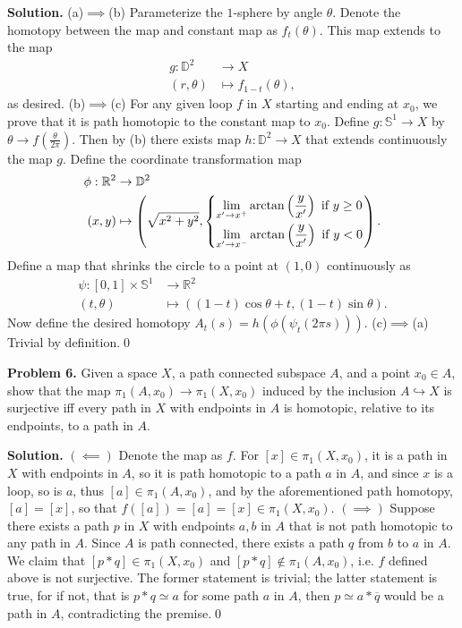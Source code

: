 \documentclass[10pt]{article}
\begin{document}
\begin{CJK*}{UTF8}{gbsn}
\textbf{Solution.} (a)$\implies$(b) Parameterize the $1$-sphere by angle $\theta$. Denote the homotopy between the map and constant map as $f_t(\theta)$. This map extends to the map \begin{align*}g:\mathbb{D}^2&\to X\\(r,\theta)&\mapsto f_{1-t}(\theta),\end{align*} as desired. (b)$\implies$(c) For any given loop $f$ in $X$ starting and ending at $x_0$, we prove that it is path homotopic to the constant map to $x_0$. Define $g:\mathbb{S}^1\to X$ by $\theta\to f(\frac{\theta}{2\pi})$. Then by (b) there exists map $h:\mathbb{D}^2\to X$ that extends continuously the map $g$. Define the coordinate transformation map \begin{align*}\phi:\mathbb{R}^2&\to\mathbb{D}^2\\(x,y)&\mapsto\left(\sqrt{x^2+y^2},\begin{dcases}\lim_{x'\to x^+}\arctan\left(\frac{y}{x'}\right)\text{ if }y\geq0\\\lim_{x'\to x^-}\arctan\left(\frac{y}{x'}\right)\text{ if }y<0\end{dcases}\right).\end{align*} Define a map that shrinks the circle to a point at $(1,0)$ continuously as \begin{align*}\psi:[0,1]\times\mathbb{S}^1&\to\mathbb{R}^2\\(t,\theta)&\mapsto((1-t)\cos\theta+t,(1-t)\sin\theta).\end{align*} Now define the desired homotopy $A_t(s)=h(\phi(\psi_t(2\pi s)))$. (c)$\implies$(a) Trivial by definition.\qed

\textbf{Problem 6.} Given a space $X$, a path connected subspace $A$, and a point $x_0\in A$, show that the map $\pi_1(A,x_0)\to\pi_1(X,x_0)$ induced by the inclusion $A\hookrightarrow X$ is surjective iff every path in $X$ with endpoints in $A$ is homotopic, relative to its endpoints, to a path in $A$.

\textbf{Solution.} $(\impliedby)$ Denote the map as $f$. For $[x]\in\pi_1(X,x_0)$, it is a path in $X$ with endpoints in $A$, so it is path homotopic to a path $a$ in $A$, and since $x$ is a loop, so is $a$, thus $[a]\in\pi_1(A,x_0)$, and by the aforementioned path homotopy, $[a]=[x]$, so that $f([a])=[a]=[x]\in\pi_1(X,x_0)$. $(\implies)$ Suppose there exists a path $p$ in $X$ with endpoints $a,b$ in $A$ that is not path homotopic to any path in $A$. Since $A$ is path connected, there exists a path $q$ from $b$ to $a$ in $A$. We claim that $[p*q]\in\pi_1(X,x_0)$ and $[p*q]\notin\pi_1(A,x_0)$, i.e. $f$ defined above is not surjective. The former statement is trivial; the latter statement is true, for if not, that is $p*q\simeq a$ for some path $a$ in $A$, then $p\simeq a*\overline{q}$ would be a path in $A$, contradicting the premise.\qed


\end{CJK*}
\end{document}
